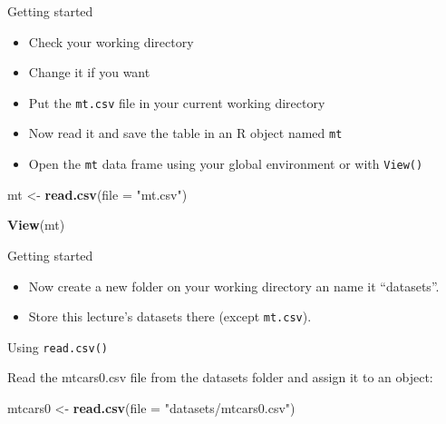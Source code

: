 \documentclass[ignorenonframetext,]{beamer}
\newenvironment{Shaded}{\begin{snugshade}}{\end{snugshade}}
\newcommand{\DataTypeTok}[1]{\textcolor[rgb]{0.13,0.29,0.53}{#1}}
\newcommand{\KeywordTok}[1]{\textcolor[rgb]{0.13,0.29,0.53}{\textbf{#1}}}
\newcommand{\NormalTok}[1]{#1}
\newcommand{\StringTok}[1]{\textcolor[rgb]{0.31,0.60,0.02}{#1}}
\begin{document}
\begin{frame}[fragile]{Getting started}
\protect\hypertarget{getting-started}{}

\begin{itemize}
\item
  Check your working directory
\item
  Change it if you want
\item
  Put the \texttt{mt.csv} file in your current working directory
\item
  Now read it and save the table in an R object named \texttt{mt}
\item
  Open the \texttt{mt} data frame using your global environment or with
  \texttt{View()}
\end{itemize}

\begin{Shaded}
\begin{Highlighting}[]
\NormalTok{mt <-}\StringTok{ }\KeywordTok{read.csv}\NormalTok{(}\DataTypeTok{file =} \StringTok{"mt.csv"}\NormalTok{)}
\end{Highlighting}
\end{Shaded}

\begin{Shaded}
\begin{Highlighting}[]
\KeywordTok{View}\NormalTok{(mt)}
\end{Highlighting}
\end{Shaded}

\end{frame}

\begin{frame}[fragile]{Getting started}
\protect\hypertarget{getting-started-1}{}

\begin{itemize}
\item
  Now create a new folder on your working directory an name it
  ``datasets''.
\item
  Store this lecture's datasets there (except \texttt{mt.csv}).
\end{itemize}

\end{frame}

\begin{frame}[fragile]{Using \texttt{read.csv()}}
\protect\hypertarget{using-read.csv}{}

Read the mtcars0.csv file from the datasets folder and assign it to an
object:

\begin{Shaded}
\begin{Highlighting}[]
\NormalTok{mtcars0 <-}\StringTok{ }\KeywordTok{read.csv}\NormalTok{(}\DataTypeTok{file =} \StringTok{"datasets/mtcars0.csv"}\NormalTok{)}
\end{Highlighting}
\end{Shaded}

\end{frame}
\end{document}

